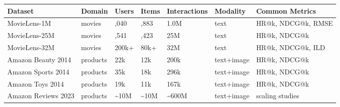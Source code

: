 {\def\LTcaptype{none} %
\begin{longtable}[]{@{}
  >{\raggedright\arraybackslash}p{}
  >{\raggedright\arraybackslash}p{}
  >{\raggedright\arraybackslash}p{}
  >{\raggedright\arraybackslash}p{}
  >{\raggedright\arraybackslash}p{}
  >{\raggedright\arraybackslash}p{}
  >{\raggedright\arraybackslash}p{}@{}}
\toprule\noalign{}
\begin{minipage}[b]{\linewidth}\raggedright
Dataset
\end{minipage} & \begin{minipage}[b]{\linewidth}\raggedright
Domain
\end{minipage} & \begin{minipage}[b]{\linewidth}\raggedright
Users
\end{minipage} & \begin{minipage}[b]{\linewidth}\raggedright
Items
\end{minipage} & \begin{minipage}[b]{\linewidth}\raggedright
Interactions
\end{minipage} & \begin{minipage}[b]{\linewidth}\raggedright
Modality
\end{minipage} & \begin{minipage}[b]{\linewidth}\raggedright
Common Metrics
\end{minipage} \\
\midrule\noalign{}
\endhead
\bottomrule\noalign{}
\endlastfoot
MovieLens-1M & movies & 6,040 & 3,883 & 1.0M & text & HR@k, NDCG@k, RMSE \\
MovieLens-25M & movies & 162,541 & 62,423 & 25M & text & HR@k, NDCG@k \\
MovieLens-32M & movies & 200k+ & 80k+ & 32M & text & HR@k, NDCG@k, ILD \\
Amazon Beauty 2014 & products & 22k & 12k & 200k & text+image & HR@k, NDCG@k \\
Amazon Sports 2014 & products & 35k & 18k & 296k & text+image & HR@k, NDCG@k \\
Amazon Toys 2014 & products & 19k & 11k & 167k & text+image & HR@k, NDCG@k \\
Amazon Reviews 2023 & products & \textasciitilde10M & \textasciitilde10M & \textasciitilde600M & text+image & scaling studies \\

\end{longtable}}
